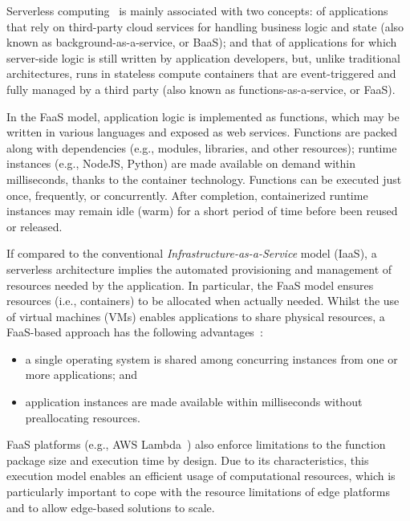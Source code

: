 Serverless computing~\cite{Lloyd18serverless,Roberts:2018} is mainly associated with two concepts: of applications that rely on third-party cloud services for handling business logic and state (also known as background-as-a-service, or BaaS); and that of applications for which server-side logic is still written by application developers, but, unlike traditional architectures, runs in stateless compute containers that are event-triggered
and fully managed by a third party (also known as functions-as-a-service, or FaaS).

In the FaaS model, application logic is implemented as functions, which may be written in various languages and exposed as web services. Functions are packed along with dependencies (e.g., modules, libraries, and other resources); runtime instances (e.g., NodeJS, Python) are made available on demand within milliseconds, thanks to the container technology. Functions can be executed just once, frequently, or concurrently. After completion, containerized runtime instances may remain idle (warm) for a short period of time before been reused or released.

If compared to the conventional \textit{Infrastructure-as-a-Service} model (IaaS), a serverless architecture implies the automated provisioning and management of resources needed by the application. In particular, the FaaS model ensures resources (i.e., containers) to be allocated when actually needed. Whilst the use of virtual machines (VMs) enables applications to share physical resources, a FaaS-based approach has the following advantages~\cite{GarrigaMendonca2017}:

\begin{itemize}
    \item a single operating system is shared among concurring instances from one or more applications; and
    \item application instances are made available within milliseconds without preallocating resources.
\end{itemize}

FaaS platforms (e.g., AWS Lambda~\cite{AWSLambda}) also enforce limitations to the function package size and execution time by design. Due to its characteristics, this execution model enables an efficient usage of computational resources, which is particularly important to cope with the resource limitations of edge platforms and to allow edge-based solutions to scale.




%



